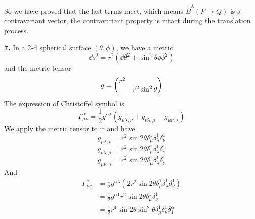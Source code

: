 \documentclass{article}
\begin{document}
So we have proved that the last terms meet, which means $\tilde B^{\lambda}(P\rightarrow Q)$ is a contravariant vector, the contravariant property is intact during the translation process.


{\bf7.}\quad
In a 2-d spherical surface $(\theta,\phi)$, we have a metric
$$\dd s^2=r^2(\dd \theta^2+\sin^2\theta\dd \phi^2)$$
and the metric tensor
$$g=\pmqty{r^2\\&r^2\sin^2\theta}$$
The expression of Christoffel symbol is
$$\Gamma^{\alpha}_{\mu\nu}=\frac{1}{2}g^{\alpha\lambda}(g_{\mu\lambda,\nu}+g_{\nu\lambda,\mu}-g_{\mu\nu,\lambda})$$
We apply the metric tensor to it and have
$$g_{\mu\lambda,\nu}=r^2\sin2\theta\delta_{\mu}^1\delta_{\lambda}^1\delta_{\nu}^1$$
$$g_{\nu\lambda,\mu}=r^2\sin2\theta\delta_{\mu}^1\delta_{\lambda}^1\delta_{\nu}^1$$
$$g_{\mu\nu,\lambda}=r^2\sin2\theta\delta_{\mu}^1\delta_{\lambda}^1\delta_{\nu}^1$$
And
\begin{align*}
  \Gamma^{\alpha}_{\mu\nu}&=\frac{1}{2}g^{\alpha\lambda}(2r^2\sin2\theta\delta_{\mu}^1\delta_{\lambda}^1\delta_{\nu}^1)\\
  &=\frac{1}{2}g^{\alpha1}r^2\sin2\theta\delta^1_{\mu}\delta^1_{\nu}\\
  &=\frac{1}{2}r^4\sin2\theta\sin^2\theta\delta^1_{\mu}\delta^1_{\nu}\delta_1^{\alpha}
\end{align*}
\end{document}
